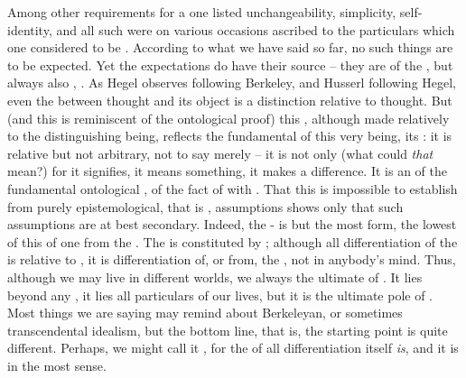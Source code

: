 Among other requirements for a  one listed unchangeability,
simplicity, self-identity, and all such were on various occasions ascribed to
the particulars which one considered to be . According to
what we have said so far, no such things are to
be expected. Yet the expectations do have their source -- they are 
of the , but always also , . As Hegel observes following Berkeley, and Husserl following Hegel, even
the  between thought and its object is a distinction relative to
thought.  But (and this is reminiscent of the ontological proof) this
, although made relatively to the distinguishing being, reflects
the fundamental  of this very being, its : it
is relative but not arbitrary, not to say merely  -- it is not
only  (what could {\em that} mean?) for it {signifies}, it
means something, it makes a difference. It is an  of the
fundamental ontological , of the fact of  with . That this is impossible to establish
from purely epistemological, that is , assumptions shows only that
such assumptions are at best secondary. Indeed, the -
 is but the most  form, the lowest  of this
  of one from the .
%
The  is constituted by ; although all
differentiation of the  is relative to , it is
differentiation of, or from, the , not in anybody's mind. Thus,
although we may live in different worlds, we always  the ultimate
 of . It lies beyond any , it
lies  all particulars of our lives, but it is the ultimate pole of
. Most things we are saying may remind about
Berkeleyan, or sometimes transcendental idealism, but the bottom line, that is,
the starting point is quite different. Perhaps, we might call it
, for the  of all differentiation itself
{\em is}, and it is in the most  sense.


